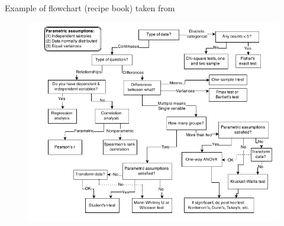 \documentclass[handout]{beamer}
\begin{document}
\begin{frame}{Example of flowchart (recipe book) taken from \cite{mcelreath2020statistical}} 


\begin{figure}[h!]
	\centering
	\includegraphics[scale=0.38]{pics/flowchart.png}
\end{figure}


 
\end{frame}
\end{document}
